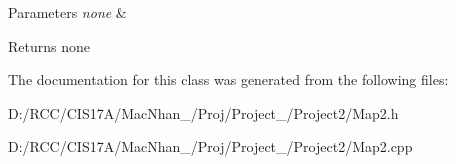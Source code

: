 \begin{DoxyParams}{Parameters}
{\em none} & \\
\hline
\end{DoxyParams}
\begin{DoxyReturn}{Returns}
none 
\end{DoxyReturn}


The documentation for this class was generated from the following files\+:\begin{DoxyCompactItemize}
\item 
D\+:/\+R\+C\+C/\+C\+I\+S17\+A/\+Mac\+Nhan\+\_/\+Proj/\+Project\+\_/\+Project2/Map2.\+h\item 
D\+:/\+R\+C\+C/\+C\+I\+S17\+A/\+Mac\+Nhan\+\_/\+Proj/\+Project\+\_/\+Project2/Map2.\+cpp\end{DoxyCompactItemize}

